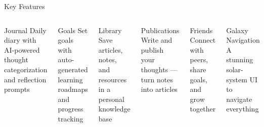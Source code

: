 \documentclass[aspectratio=43, 11pt]{beamer}
\begin{document}
\begin{frame}[shrink]{\textcolor{StarGold}{Key Features}}

  \begin{columns}[t]
    \begin{block}{\textcolor{SunGlow}{Journal}}
      \small Daily diary with AI-powered thought categorization and reflection prompts
    \end{block}
    \vspace{0.2cm}
    \begin{block}{\textcolor{NebulaPurple}{Goals}}
      \small Set goals with auto-generated learning roadmaps and progress tracking
    \end{block}
    \vspace{0.2cm}
    \begin{block}{\textcolor{NebulaTeal}{Library}}
      \small Save articles, notes, and resources in a personal knowledge base
    \end{block}

    \begin{block}{\textcolor{Corona}{Publications}}
      \small Write and publish your thoughts --- turn notes into articles
    \end{block}
    \vspace{0.2cm}
    \begin{block}{\textcolor{StarGold}{Friends}}
      \small Connect with peers, share goals, and grow together
    \end{block}
    \vspace{0.2cm}
    \begin{block}{\textcolor{SunGlow}{Galaxy Navigation}}
      \small A stunning solar-system UI to navigate everything
    \end{block}
  \end{columns}
\end{frame}
\end{document}
